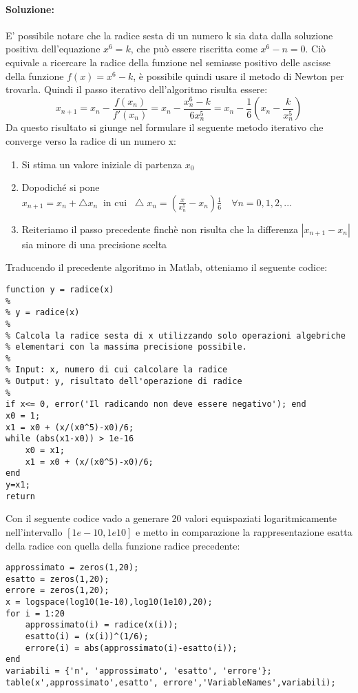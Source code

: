 \documentclass[12pt]{article}
\begin{document}
\paragraph{Soluzione:}
E' possibile notare che la radice sesta di un numero k sia data dalla soluzione positiva dell'equazione \( x^6 = k \), che può essere riscritta come \( x^6 - n= 0 \).
Ciò equivale a ricercare la radice della funzione nel semiasse positivo delle ascisse della funzione \(f(x)=x^6-k\), è possibile quindi usare il metodo di Newton per trovarla.
Quindi il passo iterativo dell'algoritmo risulta essere:
$$x_{n+1}=x_n - \frac{f(x_n)}{f'(x_n)} = x_n - \frac{x_n^6 - k}{6x_n^5} = x_n - \frac{1}{6}(x_n - \frac{k}{x_n^5})$$
Da questo risultato si giunge nel formulare il seguente metodo iterativo che converge verso la radice di un numero x:
\begin{enumerate}
    \item Si stima un valore iniziale di partenza \(x_0\)
    \item Dopodiché si pone \(x_{n+1}=x_n + \bigtriangleup x_n\;\; \text{in cui}\;\; \bigtriangleup x_n = (\frac{x}{x^{5}_n}-x_n)\frac{1}{6} \quad \forall n=0,1,2,...\)
    \item Reiteriamo il passo precedente finchè non risulta che la differenza \(|x_{n+1}-x_n|\)  sia minore di una precisione scelta
\end{enumerate}
Traducendo il precedente algoritmo in Matlab, otteniamo il seguente codice:
\begin{lstlisting}[frame=single]
function y = radice(x)
% 
% y = radice(x)
% 
% Calcola la radice sesta di x utilizzando solo operazioni algebriche
% elementari con la massima precisione possibile.
% 
% Input: x, numero di cui calcolare la radice
% Output: y, risultato dell'operazione di radice
%
if x<= 0, error('Il radicando non deve essere negativo'); end
x0 = 1;
x1 = x0 + (x/(x0^5)-x0)/6;
while (abs(x1-x0)) > 1e-16
    x0 = x1;
    x1 = x0 + (x/(x0^5)-x0)/6;
end
y=x1;
return
\end{lstlisting}
Con il seguente codice vado a generare 20 valori equispaziati logaritmicamente nell'intervallo \([1e-10,1e10]\) e metto in comparazione la rappresentazione esatta della radice con
quella della funzione radice precedente:
\begin{lstlisting}[frame=single]
approssimato = zeros(1,20);
esatto = zeros(1,20);
errore = zeros(1,20);
x = logspace(log10(1e-10),log10(1e10),20);
for i = 1:20
    approssimato(i) = radice(x(i));
    esatto(i) = (x(i))^(1/6);
    errore(i) = abs(approssimato(i)-esatto(i));
end
variabili = {'n', 'approssimato', 'esatto', 'errore'};
table(x',approssimato',esatto', errore','VariableNames',variabili);  
\end{lstlisting}
\end{document}

